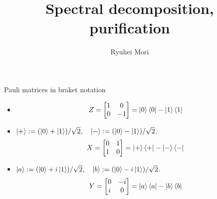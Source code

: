 \documentclass{beamer}
\title{Spectral decomposition, purification}
\author{Ryuhei Mori}
\institute{Tokyo Institute of Technology}
\begin{document}
\begin{frame}[plain]
\maketitle
\end{frame}

\begin{frame}{Pauli matrices in braket notation}
\begin{itemize}
\setlength{\itemsep}{3em}
\item
\begin{equation*}
Z=\begin{bmatrix}1&0\\0&-1\end{bmatrix}=
\ket{0}\bra{0}
-\ket{1}\bra{1}
\end{equation*}
\item
$\ket{+}:=(\ket{0}+\ket{1})/\sqrt{2},\quad  \ket{-}:=(\ket{0}-\ket{1})/\sqrt{2}$.
\begin{equation*}
X=\begin{bmatrix}0&1\\1&0\end{bmatrix}=
\ket{+}\bra{+}
-\ket{-}\bra{-}
\end{equation*}
\item
$\ket{a}:=(\ket{0}+i\ket{1})/\sqrt{2},\quad  \ket{b}:=(\ket{0}-i\ket{1})/\sqrt{2}$.
\begin{equation*}
Y=\begin{bmatrix}0&-i\\i&0\end{bmatrix}=
\ket{a}\bra{a}
-\ket{b}\bra{b}
\end{equation*}
\end{itemize}
\end{frame}
\end{document}
